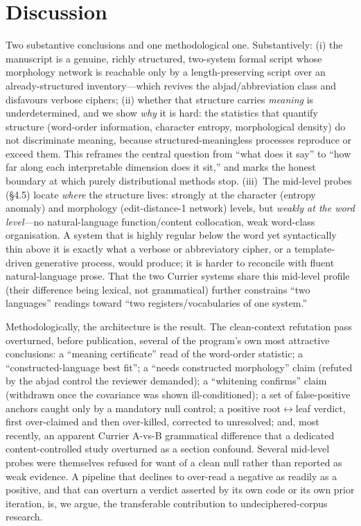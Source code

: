 \documentclass[11pt]{article}
\begin{document}
\section{Discussion}
Two substantive conclusions and one methodological one. Substantively: (i) the
manuscript is a genuine, richly structured, two-system formal script whose morphology
network is reachable only by a length-preserving script over an already-structured
inventory---which revives the abjad/abbreviation class and disfavours verbose ciphers;
(ii) whether that structure carries \emph{meaning} is underdetermined, and we show
\emph{why} it is hard: the statistics that quantify structure (word-order information,
character entropy, morphological density) do not discriminate meaning, because
structured-meaningless processes reproduce or exceed them. This reframes the central
question from ``what does it say'' to ``how far along each interpretable dimension does
it sit,'' and marks the honest boundary at which purely distributional methods stop.
(iii)~The mid-level probes (\S4.5) locate \emph{where} the structure lives: strongly at
the character (entropy anomaly) and morphology (edit-distance-1 network) levels, but
\emph{weakly at the word level}---no natural-language function/content collocation, weak
word-class organisation. A system that is highly regular below the word yet
syntactically thin above it is exactly what a verbose or abbreviatory cipher, or a
template-driven generative process, would produce; it is harder to reconcile with fluent
natural-language prose. That the two Currier systems share this mid-level profile (their
difference being lexical, not grammatical) further constrains ``two languages'' readings
toward ``two registers/vocabularies of one system.''

Methodologically, the architecture is the result. The clean-context refutation pass
overturned, before publication, several of the program's own most attractive
conclusions: a ``meaning certificate'' read of the word-order statistic; a
``constructed-language best fit''; a ``needs constructed morphology'' claim (refuted by
the abjad control the reviewer demanded); a ``whitening confirms'' claim (withdrawn
once the covariance was shown ill-conditioned); a set of false-positive anchors caught
only by a mandatory null control; a positive root$\leftrightarrow$leaf verdict, first
over-claimed and then over-killed, corrected to unresolved; and, most recently, an
apparent Currier A-vs-B grammatical difference that a dedicated content-controlled study
overturned as a section confound. Several mid-level probes were themselves refused for
want of a clean null rather than reported as weak evidence. A pipeline that declines to
over-read a negative as readily as a positive, and that can overturn a verdict asserted
by its own code or its own prior iteration, is, we argue, the transferable contribution
to undeciphered-corpus research.
\end{document}
